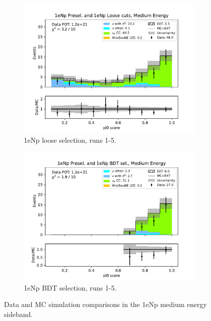 \begin{figure}[H]
\begin{subfigure}{0.33\linewidth}
        \includegraphics[width=\linewidth]{technote/Sidebands/Figures/NearSideband/near_sideband_pi0_score_run1234a4b4c4d5_NP_NPL_MEDIUM_ENERGY.pdf}
        \caption{1eNp loose selection, runs 1-5.}
    \end{subfigure}%
    \begin{subfigure}{0.33\linewidth}
        \includegraphics[width=\linewidth]{technote/Sidebands/Figures/NearSideband/near_sideband_pi0_score_run1234a4b4c4d5_NP_NPBDT_MEDIUM_ENERGY.pdf}
        \caption{1eNp BDT selection, runs 1-5.}
    \end{subfigure}
    \caption{Data and MC simulation comparisons in the 1eNp medium energy sideband.}
\end{figure}

